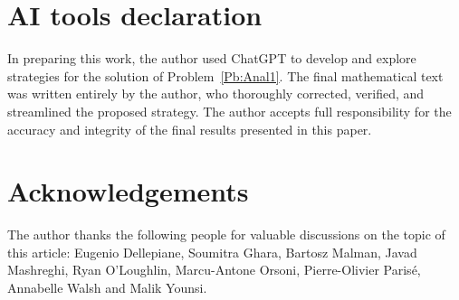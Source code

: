\documentclass[11pt,reqno]{amsart}
\theoremstyle{plain}
\theoremstyle{definition}
\theoremstyle{remark}
\begin{document}


\section*{AI tools declaration}

In preparing this work, the author used ChatGPT to develop and explore strategies for the solution of Problem~\ref{Pb:Anal1}. The final mathematical  text was written entirely by the author, who thoroughly corrected, verified, and streamlined the proposed strategy. The author accepts full responsibility for the accuracy and integrity of the final results presented in this paper.

\section*{Acknowledgements}

The author thanks the following people for valuable discussions on
the topic of this article: Eugenio Dellepiane, Soumitra Ghara, 
Bartosz Malman, Javad Mashreghi, Ryan O'Loughlin, Marcu-Antone Orsoni, Pierre-Olivier Paris\'e,
Annabelle Walsh and Malik Younsi.





\end{document}
